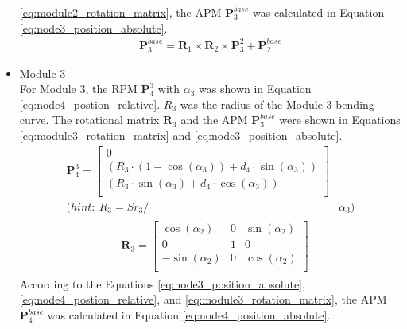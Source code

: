 \begin{itemize}
    \ref*{eq:module2_rotation_matrix}, the APM $\textbf{P}_{3}^{base}$ was calculated in Equation \ref{eq:node3_position_absolute}.
    \vspace{-5mm}
    \begin{align}
        \textbf{P}_{3}^{base} = \textbf{R}_{1} \times \textbf{R}_{2} 
        \times \textbf{P}_{3}^{2} + \textbf{P}_{2}^{base}
        \label{eq:node3_position_absolute}
    \end{align}
    \vspace{-15mm}
    \item Module 3 \\
    For Module 3, the RPM $\textbf{P}_{4}^{3}$ with $\alpha_3$ was shown in Equation \ref{eq:node4_postion_relative}. 
    $R_3$ was the radius of the Module 3 bending curve. The rotational matrix $\textbf{R}_{3}$ and the APM 
    $\textbf{P}_{3}^{base}$ were shown in Equations \ref*{eq:module3_rotation_matrix} and \ref{eq:node3_position_absolute}.
    \vspace{-5mm}
    \begin{align}
        \textbf{P}_{4}^{3} = 
        \begin{bmatrix}
            0 \\
            (R_3\cdot(1-\cos(\alpha_3)) + d_4\cdot \sin(\alpha_3)) \\
            (R_3\cdot \sin(\alpha_3) + d_4\cdot \cos(\alpha_3)) \\
        \end{bmatrix}&
        \label{eq:node4_postion_relative} \\
        \nonumber (hint: \ R_3 = {Sr}_3/ &\alpha_3)
    \end{align}
    \vspace{-15mm}
    \begin{align}
        &\begin{aligned}
            \textbf{R}_{3} = 
            \begin{bmatrix}
                \cos(\alpha_2) & 0 & \sin(\alpha_2) \\
                0 & 1 & 0 \\
                -\sin(\alpha_2) & 0 & \cos(\alpha_2) \\
            \end{bmatrix}
        \end{aligned}
        \label{eq:module3_rotation_matrix}
    \end{align}
    According to the Equations \ref{eq:node3_position_absolute}, \ref{eq:node4_postion_relative}, and 
    \ref*{eq:module3_rotation_matrix}, the APM $\textbf{P}_{4}^{base}$ was calculated in Equation \ref{eq:node4_position_absolute}.

\end{itemize}
